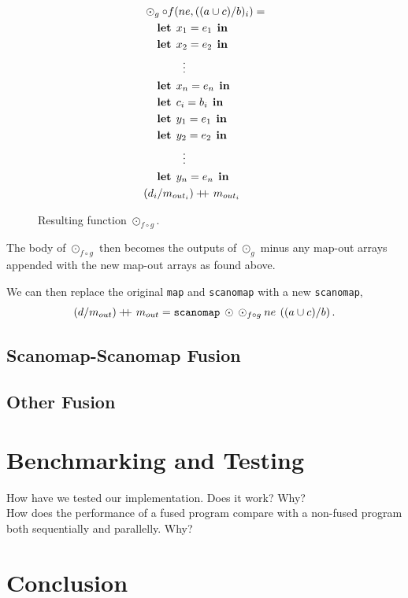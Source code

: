\documentclass[11pt]{article}
\newcommand\doubleplus{+\kern-1.3ex+\kern0.8ex}
\newcommand\lett{\phantom{-}\:\:\mathbf{let}\:\:}
\newcommand\inn{\:\:\mathbf{in}\:\:}
\begin{document}
\begin{figure}[h!]\centering
  \begin{mdframed}[style=alignbox]
    \begin{align*}
      &\odot_{g} \circ f(ne, ((a \cup c) / b)_i) = \\
      &\lett x_1 = e_1 \inn\\
      &\lett x_2 = e_2 \inn\\
      &\phantom{----}\vdots\\
      &\lett x_n = e_n \inn\\
      &\lett c_i = b_i \inn\\
      &\lett y_1 = e_1 \inn\\
      &\lett y_2 = e_2 \inn\\
      &\phantom{----}\vdots\\
      &\lett y_n = e_n \inn\\
      &(d_i /m_{out_i}) \doubleplus m_{out_i}
    \end{align*}
  \end{mdframed}

  \caption{Resulting function $\odot_{f \circ g}$.}
  \label{fig:fusresfun}
\end{figure}
The body of $\odot_{f\circ g}$ then becomes the outputs of $\odot_g$ minus any map-out arrays appended with the new map-out arrays as
 found above.

We can then replace the original \texttt{map} and \texttt{scanomap} with a new \texttt{scanomap},
$$(d / m_{out}) \doubleplus m_{out} = \mathtt{scanomap} \: \odot \: \odot_{f \circ g} \: ne \: \left((a \cup c) / b \right)\mathnormal{.} $$
\subsection{Scanomap-Scanomap Fusion}
\subsection{Other Fusion}





\section{Benchmarking and Testing}
How have we tested our implementation. Does it work? Why?\\
How does the performance of a fused program compare with a non-fused program both sequentially and parallelly. Why?

\section{Conclusion}
\newpage



\end{document}
